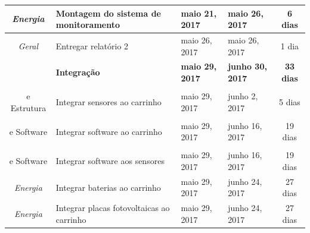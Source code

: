 \begin{longtable}{|c|m{6.5cm}|m{3.2cm}|m{3.2cm}|c|}
\textit{Energia}                                                          & Montagem do sistema de monitoramento                 & maio 21, 2017                        & maio 26, 2017                     & 6 dias                                \\ \hline
\textit{Geral}                                                            & Entregar relatório 2                                 & maio 26, 2017                        & maio 26, 2017                     & 1 dia                                 \\ \hline
\textit{}                                                                 & \textbf{Integração}                                  & \textbf{maio 29, 2017}               & \textbf{junho 30, 2017}           & \textbf{33 dias}                      \\ \hline
\textit{\begin{tabular}[c]{@{}c@{}}Eletrônica\\ e Estrutura\end{tabular}} & Integrar sensores ao carrinho                        & maio 29, 2017                        & junho 2, 2017                     & 5 dias                                \\ \hline
\textit{\begin{tabular}[c]{@{}c@{}}Eletrônica\\ e Software\end{tabular}}  & Integrar software ao carrinho                        & maio 29, 2017                        & junho 16, 2017                    & 19 dias                               \\ \hline
\textit{\begin{tabular}[c]{@{}c@{}}Eletrônica\\ e Software\end{tabular}}  & Integrar software aos sensores                       & maio 29, 2017                        & junho 16, 2017                    & 19 dias                               \\ \hline
\textit{Energia}                                                          & Integrar baterias ao carrinho                        & maio 29, 2017                        & junho 24, 2017                    & 27 dias                               \\ \hline
\textit{Energia}                                                          & Integrar placas fotovoltaicas ao carrinho            & maio 29, 2017                        & junho 24, 2017                    & 27 dias                               \\ \hline

\end{longtable}
